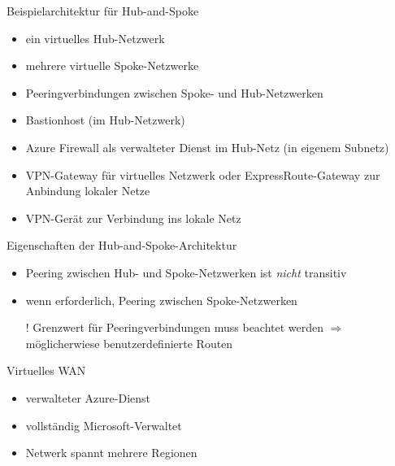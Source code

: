 \begin{flashcard}[]{Beispielarchitektur für Hub-and-Spoke}
  \begin{itemize}
    \item ein virtuelles Hub-Netzwerk
    \item mehrere virtuelle Spoke-Netzwerke
    \item Peeringverbindungen zwischen Spoke- und Hub-Netzwerken
    \item Bastionhost (im Hub-Netzwerk)
    \item Azure Firewall als verwalteter Dienst im Hub-Netz (in eigenem Subnetz)
    \item VPN-Gateway für virtuelles Netzwerk oder ExpressRoute-Gateway\newline
      zur Anbindung lokaler Netze
    \item VPN-Gerät zur Verbindung ins lokale Netz
  \end{itemize}
\end{flashcard}

\begin{flashcard}[]{Eigenschaften der Hub-and-Spoke-Architektur}
  \begin{itemize}
    \item Peering zwischen Hub- und Spoke-Netzwerken ist \emph{nicht} transitiv
    \item wenn erforderlich, Peering zwischen Spoke-Netzwerken
    \item[!] Grenzwert für Peeringverbindungen muss beachtet werden\newline
      $\Rightarrow$ möglicherwiese benutzerdefinierte Routen
  \end{itemize}
\end{flashcard}

\begin{flashcard}[]{Virtuelles WAN}
  \begin{itemize}
    \item verwalteter Azure-Dienst
    \item vollständig Microsoft-Verwaltet
    \item Netwerk spannt mehrere Regionen
  \end{itemize}
\end{flashcard}

